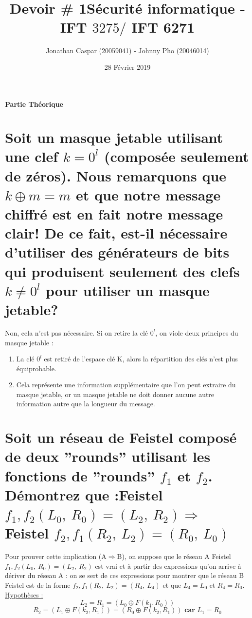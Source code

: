 \documentclass[fleqn]{article}
\title{Devoir \# 1\linebreak S\'{e}curit\'{e} informatique - IFT $3275 /$ IFT 6271}
\author{Jonathan Caspar (20059041) - Johnny Pho (20046014)}
\date{28 Février 2019}
\begin{document}
\maketitle
{\Large\bfseries Partie Théorique\par}

\section{\normalsize Soit un masque jetable utilisant une clef $k = 0^l$
(composée
seulement de zéros). Nous remarquons que $k \oplus m = m$ et que notre
message chiffré est en fait notre message clair! De ce fait, est-il nécessaire
d’utiliser des générateurs de bits qui produisent seulement des clefs $k\neq 0^{l}$
pour utiliser un masque jetable?}

Non, cela n'est pas nécessaire. Si on retire la clé $0^l$, on viole deux principes du masque jetable :

\begin{enumerate}  
\item La clé $0^l$ est retiré de l'espace clé K, alors la répartition des clés n'est plus équiprobable.
\item Cela représente une information supplémentaire que l'on peut extraire du masque jetable, or un masque jetable ne doit donner aucune autre information autre que la longueur du message.
\end{enumerate}

\section{\normalsize Soit un réseau de Feistel composé de deux ''rounds'' utilisant les fonctions de ''rounds'' $f_{1}$ et $f_{2}$. Démontrez que :\linebreak Feistel $f_{1}, f_{2}(L_{0},\ R_{0})=(L_{2},\ R_{2}) \Rightarrow$ Feistel $f_{2}, f_{1}(R_{2},\ L_{2})=(R_{0},\ L_{0})$ }

Pour prouver cette implication (A$\Rightarrow$B), on suppose que le réseau A Feistel $f_{1}, f_{2}(L_{0},\ R_{0})=(L_{2},\ R_{2})$ est vrai et à partir des expressions qu'on arrive à dériver du réseau A : on se sert de ces expressions pour montrer que le réseau B Feistel est de la forme $f_{2}, f_{1}(R_{2},\ L_{2})=(R_{4},\ L_{4})$ et que $L_{4} = L_{0}$ et $R_{4} = R_{0}$.
\newline\newline
\underline{Hypothèses :}
\[L_2 = R_1 = \boxed{(L_0 \oplus F(k_1, R_0))}\]
\[R_2 = (L_1 \oplus F(k_2, R_1)) = \boxed{(R_0 \oplus F(k_2, R_1))} \textbf{ car } L_1 = R_0\]
\end{document}
